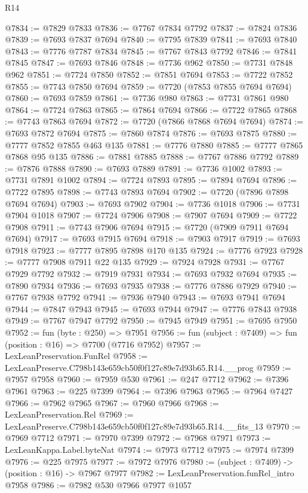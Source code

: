 \begin{lexlean}{R14}
\begin{coremodule}
@7834 := @7829 @7833
@7836 := @7767 @7834 @7792
@7837 := @7824 @7836
@7839 := @7693 @7837 @7694
@7840 := @7795 @7839
@7841 := @7693 @7840
@7843 := @7776 @7787 @7834
@7845 := @7767 @7843 @7792
@7846 := @7841 @7845
@7847 := @7693 @7846
@7848 := @7736 @962
@7850 := @7731 @7848 @962
@7851 := @7724 @7850
@7852 := @7851 @7694
@7853 := @7722 @7852
@7855 := @7743 @7850 @7694
@7859 := @7720 (@7853 @7855 @7694 @7694)
@7860 := @7693 @7859
@7861 := @7736 @980
@7863 := @7731 @7861 @980
@7864 := @7724 @7863
@7865 := @7864 @7694
@7866 := @7722 @7865
@7868 := @7743 @7863 @7694
@7872 := @7720 (@7866 @7868 @7694 @7694)
@7874 := @7693 @7872 @7694
@7875 := @7860 @7874
@7876 := @7693 @7875
@7880 := @7777 @7852 @7855 @463 @135
@7881 := @7776 @7880
@7885 := @7777 @7865 @7868 @95 @135
@7886 := @7881 @7885
@7888 := @7767 @7886 @7792
@7889 := @7876 @7888
@7890 := @7693 @7889
@7891 := @7736 @1002
@7893 := @7731 @7891 @1002
@7894 := @7724 @7893
@7895 := @7894 @7694
@7896 := @7722 @7895
@7898 := @7743 @7893 @7694
@7902 := @7720 (@7896 @7898 @7694 @7694)
@7903 := @7693 @7902
@7904 := @7736 @1018
@7906 := @7731 @7904 @1018
@7907 := @7724 @7906
@7908 := @7907 @7694
@7909 := @7722 @7908
@7911 := @7743 @7906 @7694
@7915 := @7720 (@7909 @7911 @7694 @7694)
@7917 := @7693 @7915 @7694
@7918 := @7903 @7917
@7919 := @7693 @7918
@7923 := @7777 @7895 @7898 @170 @135
@7924 := @7776 @7923
@7928 := @7777 @7908 @7911 @22 @135
@7929 := @7924 @7928
@7931 := @7767 @7929 @7792
@7932 := @7919 @7931
@7934 := @7693 @7932 @7694
@7935 := @7890 @7934
@7936 := @7693 @7935
@7938 := @7776 @7886 @7929
@7940 := @7767 @7938 @7792
@7941 := @7936 @7940
@7943 := @7693 @7941 @7694
@7944 := @7847 @7943
@7945 := @7693 @7944
@7947 := @7776 @7843 @7938
@7949 := @7767 @7947 @7792
@7950 := @7945 @7949
@7951 := @7695 @7950
@7952 := fun (byte : @250) => @7951
@7956 := fun (subject : @7409) => fun (position : @16) => @7700 (@7716 @7952)
@7957 := LexLeanPreservation.FunRel
@7958 := LexLeanPreserve.C798b143e659cb50f0f127c89e7d93b65.R14.__prog
@7959 := @7957 @7958
@7960 := @7959 @530
@7961 := @247 @7712
@7962 := @7396 @7961
@7963 := @225 @7399
@7964 := @7396 @7963
@7965 := @7964 @7427
@7966 := @7962 @7965
@7967 := @7960 @7966
@7968 := LexLeanPreservation.Rel
@7969 := LexLeanPreserve.C798b143e659cb50f0f127c89e7d93b65.R14.__fits_13
@7970 := @7969 @7712
@7971 := @7970 @7399
@7972 := @7968 @7971
@7973 := LexLeanKappa.Label.byteNat
@7974 := @7973 @7712
@7975 := @7974 @7399
@7976 := @225 @7975
@7977 := @7972 @7976
@7980 := (subject : @7409) -> (position : @16) -> @7967 @7977
@7982 := LexLeanPreservation.funRel_intro @7958
@7986 := @7982 @530 @7966 @7977 @1057

\end{coremodule}
\end{lexlean}
